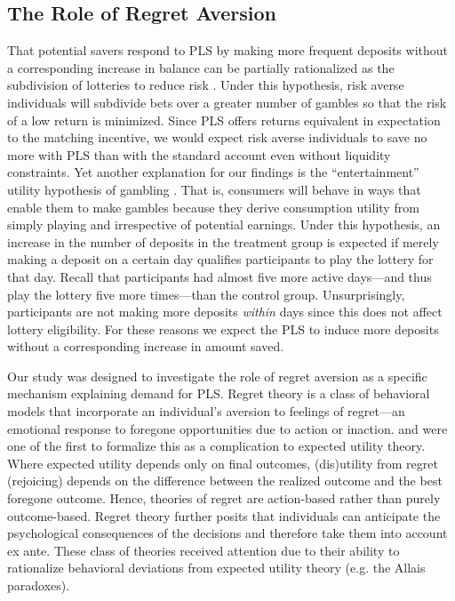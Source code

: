 \documentclass[11pt]{article}
\begin{document}
	\subsection{The Role of Regret Aversion} \label{sec:mechanisms}

		That potential savers respond to PLS by making more frequent deposits without a corresponding increase in balance can be partially rationalized as the subdivision of lotteries to reduce risk \parencite{samuelson_risk_1963}. Under this hypothesis, risk averse individuals will subdivide bets over a greater number of gambles so that the risk of a low return is minimized. Since PLS offers returns equivalent in expectation to the matching incentive, we would expect risk averse individuals to save no more with PLS than with the standard account even without liquidity constraints. Yet another explanation for our findings is the ``entertainment'' utility hypothesis of gambling \parencite{conlisk_utility_1993}. That is, consumers will behave in ways that enable them to make gambles because they derive consumption utility from simply playing and irrespective of potential earnings. Under this hypothesis, an increase in the number of deposits in the treatment group is expected if merely making a deposit on a certain day qualifies participants to play the lottery for that day. Recall that participants had almost five more active days---and thus play the lottery five more times---than the control group. Unsurprisingly, participants are not making more deposits \textit{within} days since this does not affect lottery eligibility. For these reasons we expect the PLS to induce more deposits without a corresponding increase in amount saved.

		Our study was designed to investigate the role of regret aversion as a specific mechanism explaining demand for PLS. Regret theory is a class of behavioral models that incorporate an individual's aversion to feelings of regret---an emotional response to foregone opportunities due to action or inaction. \textcite{bell_risk_1983} and \textcite{loomes_regret_1982} were one of the first to formalize this as a complication to expected utility theory. Where expected utility depends only on final outcomes, (dis)utility from regret (rejoicing) depends on the difference between the realized outcome and the best foregone outcome. Hence, theories of regret are action-based rather than purely outcome-based. Regret theory further posits that individuals can anticipate the psychological consequences of the decisions and therefore take them into account ex ante. These class of theories received attention due to their ability to rationalize behavioral deviations from expected utility theory (e.g. the Allais paradoxes).
\end{document}
